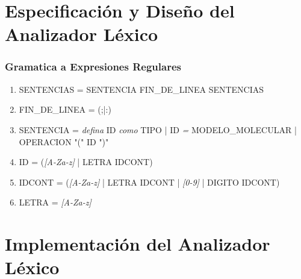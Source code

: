 \section{Especificación y Diseño del Analizador Léxico}

\subsubsection{Gramatica a Expresiones Regulares}

\begin{enumerate}
    \item SENTENCIAS = SENTENCIA FIN\_DE\_LINEA SENTENCIAS
    \item FIN\_DE\_LINEA = (;|:)
    \item SENTENCIA = \textit{defina} ID \textit{como} TIPO | ID \textit{=} MODELO\_MOLECULAR | OPERACION "(" ID ")"
    \item ID = (\textit{[A-Za-z]} | LETRA IDCONT)
    \item IDCONT = (\textit{[A-Za-z]} | LETRA IDCONT | \textit{[0-9]} | DIGITO IDCONT)
    \item LETRA = \textit{[A-Za-z]}
\end{enumerate}

\section{Implementación del Analizador Léxico}